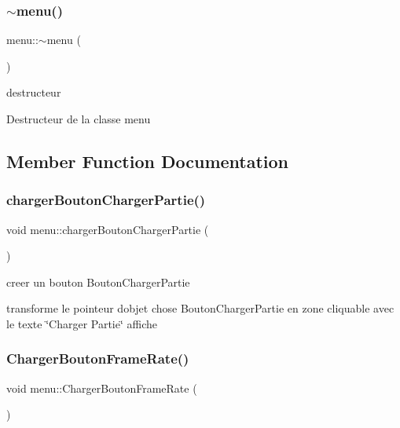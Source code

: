 \subsubsection{\texorpdfstring{$\sim$menu()}{~menu()}}
{\footnotesize\ttfamily menu\+::$\sim$menu (\begin{DoxyParamCaption}{ }\end{DoxyParamCaption})}



destructeur 

Destructeur de la classe menu 

\subsection{Member Function Documentation}
\mbox{\label{classmenu_ac5f982433431cf4a89d6b8abf6f9cc69}} 
\subsubsection{\texorpdfstring{charger\+Bouton\+Charger\+Partie()}{chargerBoutonChargerPartie()}}
{\footnotesize\ttfamily void menu\+::charger\+Bouton\+Charger\+Partie (\begin{DoxyParamCaption}{ }\end{DoxyParamCaption})}



creer un bouton Bouton\+Charger\+Partie 

transforme le pointeur d\textquotesingle{}objet chose Bouton\+Charger\+Partie en zone cliquable avec le texte \char`\"{}\+Charger Partie\char`\"{} affiche \mbox{\label{classmenu_ad6efc2e7479c9214b699b29f9ed82815}} 
\subsubsection{\texorpdfstring{Charger\+Bouton\+Frame\+Rate()}{ChargerBoutonFrameRate()}}
{\footnotesize\ttfamily void menu\+::\+Charger\+Bouton\+Frame\+Rate (\begin{DoxyParamCaption}{ }\end{DoxyParamCaption})}



